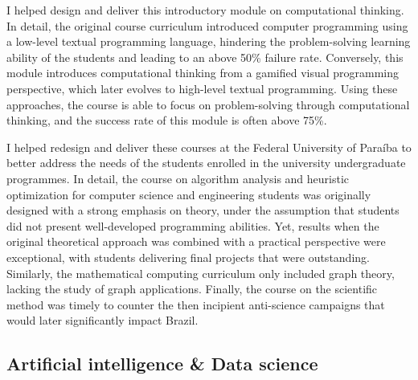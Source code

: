 \cvline{}{\hrule}

%
{I helped design and deliver this introductory module on computational thinking. In detail, the original course curriculum introduced computer programming using a low-level textual programming language, hindering the problem-solving learning ability of the students and leading to an above 50\% failure rate. Conversely, this module introduces computational thinking from a gamified visual programming perspective, which later evolves to high-level textual programming. Using these approaches, the course is able to focus on problem-solving through computational thinking, and the success rate of this module is often above 75\%.}

\cvline{}{\hrule}

%
{I helped redesign and deliver these courses at the Federal University of Paraíba to better address the needs of the students enrolled in the university undergraduate programmes. In detail, the course on algorithm analysis and heuristic optimization for computer science and engineering students was originally designed with a strong emphasis on theory, under the assumption that students did not present well-developed programming abilities. Yet, results when the original theoretical approach was combined with a practical perspective were exceptional, with students delivering final projects that were outstanding. Similarly, the mathematical computing curriculum only included graph theory, lacking the study of graph applications. Finally, the course on the scientific method was timely to counter the then incipient anti-science campaigns that would later significantly impact Brazil.}

\subsection{Artificial intelligence \& Data science}

